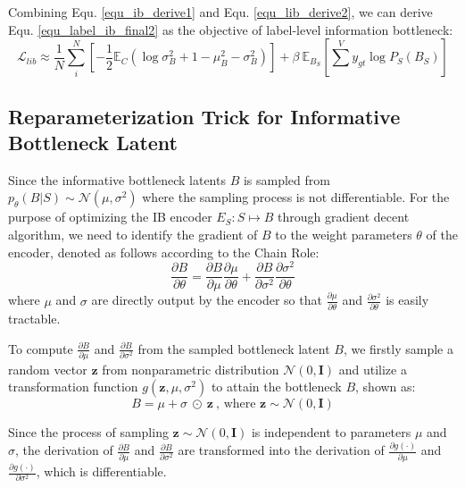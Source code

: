 \documentclass{article}
\begin{document}
Combining Equ. \ref{equ_ib_derive1} and Equ. \ref{equ_lib_derive2}, we can derive Equ. \ref{equ_label_ib_final2} as the objective of label-level information bottleneck:
\begin{equation}
    \mathcal{L}_{lib} \approx \frac{1}{N}\sum^N_{i} \left[-\frac{1}{2} \mathbb{E}_C  \left(\log \sigma^2_B + 1 - \mu^2_B-\sigma^2_B\right) \right] + \beta\ \mathbb{E}_{B_S} [\sum^V y_{gt}\log{P_S(B_S)}]
\end{equation}

\subsection{Reparameterization Trick for Informative Bottleneck Latent} 
Since the informative bottleneck latents $B$ is sampled from $p_\theta(B|S)\sim\mathcal{N}(\mu, \sigma^2)$ where the sampling process is not differentiable. For the purpose of optimizing the IB encoder $E_S:S\mapsto B$ through gradient decent algorithm, we need to identify the gradient of $B$ to the weight parameters $\theta$ of the encoder, denoted as follows according to the Chain Role:
\begin{equation}
    \frac{\partial B}{\partial\theta}=\frac{\partial B}{\partial\mu}\frac{\partial \mu}{\partial\theta} + \frac{\partial B}{\partial\sigma^2}\frac{\partial \sigma^2}{\partial\theta} 
\end{equation}
where $\mu$ and $\sigma$ are directly output by the encoder so that $\frac{\partial \mu}{\partial\theta}$ and $\frac{\partial \sigma^2}{\partial\theta}$ is easily tractable. 

To compute $\frac{\partial B}{\partial\mu}$ and $\frac{\partial B}{\partial\sigma^2}$ from the sampled bottleneck latent $B$, we firstly sample a random vector $\textbf{z}$ from nonparametric distribution $\mathcal{N}(0, \textbf{I})$ and utilize a transformation function $g(\textbf{z},\mu,\sigma^2)$ to attain the bottleneck $B$, shown as:
\begin{equation}
    B=\mu+\sigma\ \odot\ \textbf{z} \ \text{, where } \textbf{z} \sim \mathcal{N}(0,\textbf{I})
\end{equation}

Since the process of sampling $\textbf{z}\sim\mathcal{N}(0, \textbf{I})$ is independent to parameters $\mu$ and $\sigma$, the derivation of $\frac{\partial B}{\partial\mu}$ and $\frac{\partial B}{\partial\sigma^2}$ are transformed into the derivation of $\frac{\partial g(\cdot)}{\partial\mu}$ and $\frac{\partial g(\cdot)}{\partial\sigma^2}$, which is differentiable.
\end{document}
